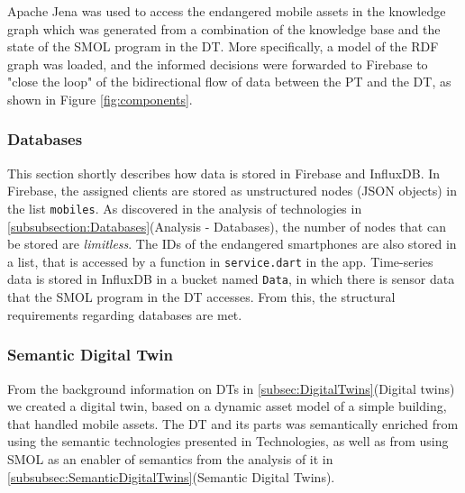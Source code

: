 \documentclass{article}
\begin{document}
Apache Jena was used to access the endangered mobile assets in the knowledge graph which was generated from a combination of the knowledge base and the state of the SMOL program in the DT. More specifically, a model of the RDF graph was loaded, and the informed decisions were forwarded to Firebase to "close the loop" of the bidirectional flow of data between the PT and the DT, as shown in Figure \ref{fig:components}.

\subsubsection{Databases}
This section shortly describes how data is stored in Firebase and InfluxDB.
In Firebase, the assigned clients are stored as unstructured nodes (JSON objects) in the list \verb|mobiles|. As discovered in the analysis of technologies in \ref{subsubsection:Databases}(Analysis - Databases), the number of nodes that can be stored are \emph{limitless}. The IDs of the endangered smartphones are also stored in a list, that is accessed by a function in \verb|service.dart| in the app. Time-series data is stored in InfluxDB in a bucket named \verb|Data|, in which there is sensor data that the SMOL program in the DT accesses. From this, the structural requirements regarding databases are met.


\subsubsection{Semantic Digital Twin}
From the background information on DTs in \ref{subsec:DigitalTwins}(Digital twins) we created a digital twin, based on a dynamic asset model of a simple building, that handled mobile assets. The DT and its parts was semantically enriched from using the semantic technologies presented in Technologies, as well as from using SMOL as an enabler of semantics from the analysis of it in \ref{subsubsec:SemanticDigitalTwins}(Semantic Digital Twins). 
\end{document}
